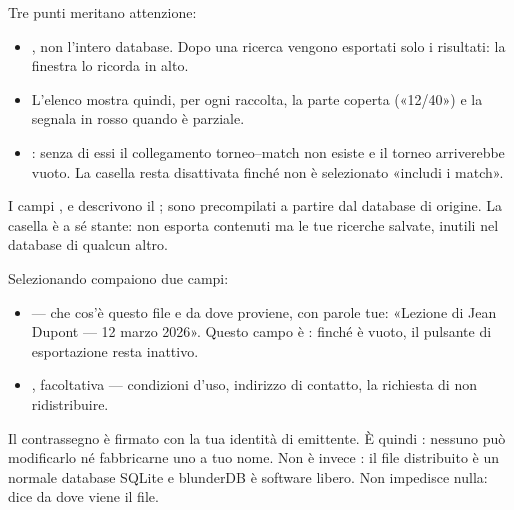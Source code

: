 \documentclass[letterpaper,10pt,italian]{sphinxmanual}
\begin{document}
\sphinxAtStartPar
Tre punti meritano attenzione:
\begin{itemize}
\item {} 
\sphinxAtStartPar
{}, non l’intero database. Dopo una ricerca vengono esportati solo i risultati: la finestra lo ricorda in alto.

\item {} 
\sphinxAtStartPar
{} L’elenco mostra quindi, per ogni raccolta, la parte coperta («12/40») e la segnala in rosso quando è parziale.

\item {} 
\sphinxAtStartPar
{}: senza di essi il collegamento torneo–match non esiste e il torneo arriverebbe vuoto. La casella resta disattivata finché non è selezionato «includi i match».

\end{itemize}

\sphinxAtStartPar
I campi ,  e  descrivono il ; sono precompilati a partire dal database di origine. La casella  è a sé stante: non esporta contenuti ma le tue ricerche salvate, inutili nel database di qualcun altro.

\sphinxAtStartPar
Selezionando  compaiono due campi:
\begin{itemize}
\item {} 
\sphinxAtStartPar
{} — che cos’è questo file e da dove proviene, con parole tue: «Lezione di Jean Dupont — 12 marzo 2026». Questo campo è : finché è vuoto, il pulsante di esportazione resta inattivo.

\item {} 
\sphinxAtStartPar
{}, facoltativa — condizioni d’uso, indirizzo di contatto, la richiesta di non ridistribuire.

\end{itemize}

\sphinxAtStartPar
Il contrassegno è firmato con la tua identità di emittente. È quindi : nessuno può modificarlo né fabbricarne uno a tuo nome. Non è invece : il file distribuito è un normale database SQLite e blunderDB è software libero. Non impedisce nulla: dice da dove viene il file.
\end{document}
